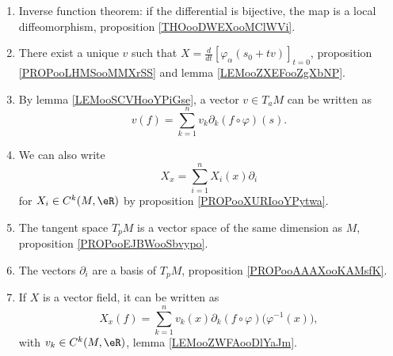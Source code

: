 \begin{enumerate}
	\item
	      Inverse function theorem: if the differential is bijective, the map is a local diffeomorphism, proposition \ref{THOooDWEXooMClWVi}.
	\item
	      There exist a unique \( v\) such that \( X=\frac{d}{dt} \left[ \varphi_{\alpha}(s_0+tv)  \right]_{t=0}\), proposition \ref{PROPooLHMSooMMXrSS} and lemma \ref{LEMooZXEFooZgXbNP}.
	\item
	      By lemma \ref{LEMooSCVHooYPiGse}, a vector \( v\in T_aM\) can be written as
	      \begin{equation}
		      v(f)=\sum_{k=1}^nv_k\partial_k(f\circ \varphi)(s).
	      \end{equation}
	\item
	      We can also write
	      \begin{equation}
		      X_x=\sum_{i=1}^nX_i(x)\partial_i
	      \end{equation}
	      for \( X_i\in C^k(M, \eR)\) by proposition \ref{PROPooXURIooYPytwa}.
	\item
	      The tangent space \( T_pM\) is a vector space of the same dimension as \( M\), proposition \ref{PROPooEJBWooSbvypo}.
	\item
	      The vectors \( \partial_i\) are a basis of \( T_pM\), proposition \ref{PROPooAAAXooKAMsfK}.
	\item
	      If \( X\) is a vector field, it can be written as
	      \begin{equation}
		      X_x(f)=\sum_{k=1}^nv_k(x)\partial_k(f\circ\varphi)\big( \varphi^{-1}(x) \big),
	      \end{equation}
	      with \( v_k\in C^k(M, \eR)\), lemma \ref{LEMooZWFAooDlYaJm}.
\end{enumerate}
